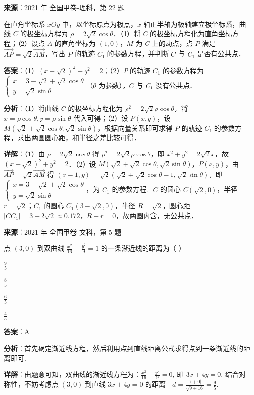 \begin{question}[points=10]
\textbf{来源：}2021 年 全国甲卷-理科，第 22 题\par
在直角坐标系 $xOy$ 中，以坐标原点为极点，$x$ 轴正半轴为极轴建立极坐标系，曲线 $C$ 的极坐标方程为 $\rho = 2\sqrt{2}\cos\theta$．（1）将 $C$ 的极坐标方程化为直角坐标方程；（2）设点 $A$ 的直角坐标为 $(1,0)$，$M$ 为 $C$ 上的动点，点 $P$ 满足 $\overrightarrow{AP} = \sqrt{2}\overrightarrow{AM}$，写出 $P$ 的轨迹 $C_1$ 的参数方程，并判断 $C$ 与 $C_1$ 是否有公共点．
\begin{solution}
\textbf{答案：}（1）$(x-\sqrt{2})^2+y^2=2$；（2）$P$ 的轨迹 $C_1$ 的参数方程为 $\begin{cases} x = 3-\sqrt{2}+\sqrt{2}\cos\theta \\ y = \sqrt{2}\sin\theta \end{cases}$（$\theta$ 为参数），$C$ 与 $C_1$ 没有公共点．

\textbf{分析：}（1）将曲线 $C$ 的极坐标方程化为 $\rho^2 = 2\sqrt{2}\rho\cos\theta$，将 $x=\rho\cos\theta, y=\rho\sin\theta$ 代入可得；（2）设 $P(x,y)$，设 $M(\sqrt{2}+\sqrt{2}\cos\theta, \sqrt{2}\sin\theta)$，根据向量关系即可求得 $P$ 的轨迹 $C_1$ 的参数方程，求出两圆圆心距，和半径之差比较可得．

\textbf{详解：}（1）由 $\rho=2\sqrt{2}\cos\theta$ 得 $\rho^2=2\sqrt{2}\rho\cos\theta$，即 $x^2+y^2=2\sqrt{2}x$，故 $(x-\sqrt{2})^2+y^2=2$．（2）设 $M(\sqrt{2}+\sqrt{2}\cos\theta, \sqrt{2}\sin\theta)$，$P(x,y)$，由 $\overrightarrow{AP}=\sqrt{2}\overrightarrow{AM}$ 得 $(x-1,y)=\sqrt{2}(\sqrt{2}+\sqrt{2}\cos\theta-1, \sqrt{2}\sin\theta)$，即 $\begin{cases} x = 3-\sqrt{2}+\sqrt{2}\cos\theta \\ y = \sqrt{2}\sin\theta \end{cases}$，为 $C_1$ 的参数方程．$C$ 的圆心 $C(\sqrt{2},0)$，半径 $r=\sqrt{2}$；$C_1$ 的圆心 $C_1(3-\sqrt{2},0)$，半径 $R=\sqrt{2}$，圆心距 $|CC_1| = 3-2\sqrt{2} \approx 0.172$，$R-r = 0$，故两圆内含，无公共点．
\end{solution}
\end{question}

\begin{question}[points=5]
\textbf{来源：}2021 年 全国甲卷-文科，第 5 题\par
点 $(3,0)$ 到双曲线 $\frac{x^2}{16} - \frac{y^2}{9} = 1$ 的一条渐近线的距离为（ ）
\begin{choices}
  \item $\frac{9}{5}$
  \item $\frac{8}{5}$
  \item $\frac{6}{5}$
  \item $\frac{4}{5}$
\end{choices}
\begin{solution}
\textbf{答案：}A

\textbf{分析：}首先确定渐近线方程，然后利用点到直线距离公式求得点到一条渐近线的距离即可.

\textbf{详解：}由题意可知，双曲线的渐近线方程为：$\frac{x^2}{16} - \frac{y^2}{9} = 0$, 即 $3x \pm 4y = 0$. 结合对称性，不妨考虑点 $(3,0)$ 到直线 $3x+4y=0$ 的距离：$d = \frac{|9+0|}{\sqrt{9+16}} = \frac{9}{5}$.
\end{solution}
\end{question}

